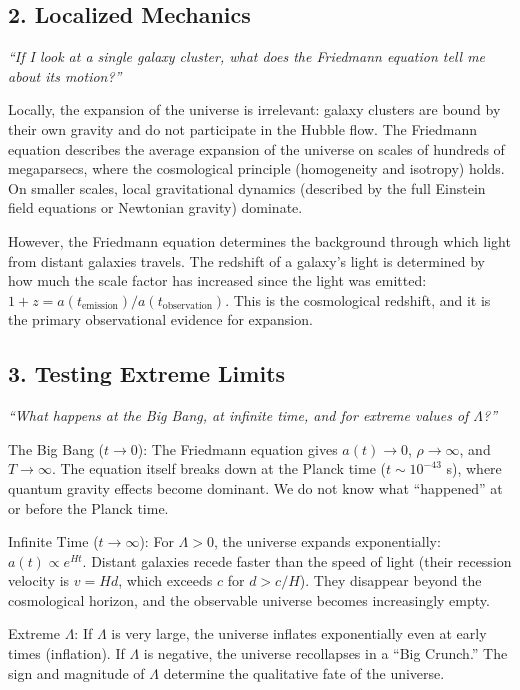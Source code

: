 \documentclass[11pt,openright]{book}
\begin{document}
\subsection*{2. Localized Mechanics}
\textit{``If I look at a single galaxy cluster, what does the Friedmann equation tell me about its motion?''}

Locally, the expansion of the universe is irrelevant: galaxy clusters are bound by their own gravity and do not participate in the Hubble flow. The Friedmann equation describes the average expansion of the universe on scales of hundreds of megaparsecs, where the cosmological principle (homogeneity and isotropy) holds. On smaller scales, local gravitational dynamics (described by the full Einstein field equations or Newtonian gravity) dominate.

However, the Friedmann equation determines the background through which light from distant galaxies travels. The redshift of a galaxy's light is determined by how much the scale factor has increased since the light was emitted: $1 + z = a(t_{\text{emission}})/a(t_{\text{observation}})$. This is the cosmological redshift, and it is the primary observational evidence for expansion.

\subsection*{3. Testing Extreme Limits}
\textit{``What happens at the Big Bang, at infinite time, and for extreme values of $\Lambda$?''}

The Big Bang ($t \to 0$): The Friedmann equation gives $a(t) \to 0$, $\rho \to \infty$, and $T \to \infty$. The equation itself breaks down at the Planck time ($t \sim 10^{-43}$ s), where quantum gravity effects become dominant. We do not know what ``happened'' at or before the Planck time.

Infinite Time ($t \to \infty$): For $\Lambda > 0$, the universe expands exponentially: $a(t) \propto e^{Ht}$. Distant galaxies recede faster than the speed of light (their recession velocity is $v = H d$, which exceeds $c$ for $d > c/H$). They disappear beyond the cosmological horizon, and the observable universe becomes increasingly empty.

Extreme $\Lambda$: If $\Lambda$ is very large, the universe inflates exponentially even at early times (inflation). If $\Lambda$ is negative, the universe recollapses in a ``Big Crunch.'' The sign and magnitude of $\Lambda$ determine the qualitative fate of the universe.
\end{document}
